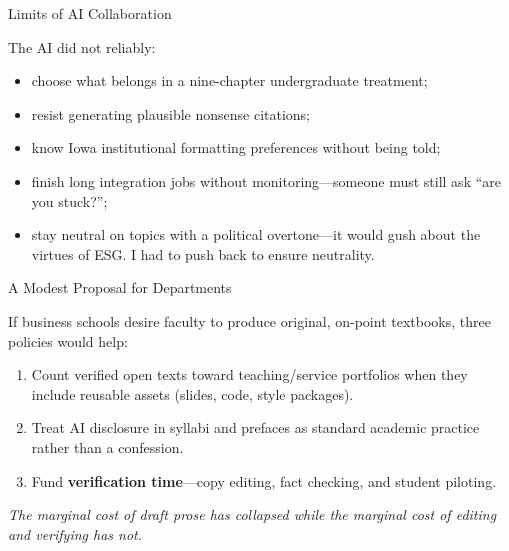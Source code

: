 \documentclass[aspectratio=169]{beamer}
\begin{document}
\begin{frame}{Limits of AI Collaboration}

The AI did not reliably:

\begin{itemize}\setlength\itemsep{0.7em}
  \item choose what belongs in a nine-chapter undergraduate treatment;
  \item resist generating plausible nonsense citations;
  \item know Iowa institutional formatting preferences without being told;
  \item finish long integration jobs without monitoring---someone must still
        ask ``are you stuck?'';
  \item stay neutral on topics with a political overtone---it would gush
        about the virtues of ESG. I had to push back to ensure neutrality.
\end{itemize}

\end{frame}

\begin{frame}{A Modest Proposal for Departments}

If business schools desire faculty to produce original, on-point textbooks,
three policies would help:

\begin{enumerate}\setlength\itemsep{0.8em}
  \item Count verified open texts toward teaching/service portfolios when
        they include reusable assets (slides, code, style packages).
  \item Treat AI disclosure in syllabi and prefaces as standard academic
        practice rather than a confession.
  \item Fund \textbf{verification time}---copy editing, fact checking, and
        student piloting.
\end{enumerate}

\bigskip
\textit{The marginal cost of draft prose has collapsed while the marginal
cost of editing and verifying has not.}

\end{frame}
\end{document}
